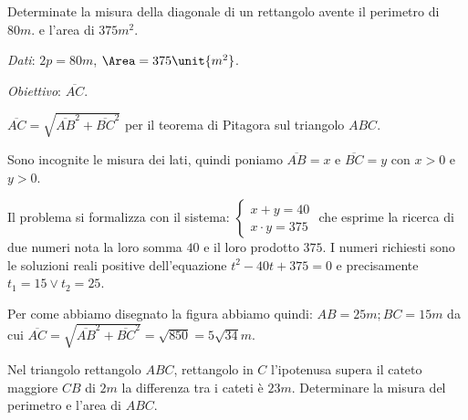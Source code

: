 \begin{problema}
Determinate la misura della diagonale di un rettangolo avente il perimetro di 
\(80\unit{m}\). e l'area di \(375\unit{m^2}\).
\end{problema}

{
\emph{Dati}: \(2 p = 80 \unit{m}\), \(\Area = 375\unit{m^2}\).

\emph{Obiettivo}: \(\overline {AC}\).
}
{\begin{center}
 
\end{center}}

\begin{soluzione}

\(\overline {AC} = \sqrt{\overline {AB}^{2} +\overline {BC}^{2}}\) per il 
teorema 
di Pitagora sul triangolo \(ABC\).

Sono incognite le misura dei lati, quindi poniamo \(\overline {AB} = x\) e 
\(\overline {BC} = y \) con \(x > 0\) e \(y > 0\).

Il problema si formalizza con il sistema:
\(\left\{ \begin{array}{l} x +y = 40 \\x \cdot y = 375 \end{array}\right.\)
che esprime la ricerca di due numeri nota la loro somma \(40\) e il loro 
prodotto 
\(375\). I numeri richiesti sono le soluzioni reali positive dell'equazione 
\(t^{2} 
-40 t +375 = 0\) e precisamente \(t_{1} = 15 \vee t_{2} = 25\).

Per come abbiamo disegnato la figura abbiamo quindi: \(AB = 25\unit{m}; BC = 
15\unit{m}\) da cui \(\overline {AC} = \sqrt{\overline {AB}^{2} +\overline 
{BC}^{2}} =\sqrt{850} = 5 \sqrt{34}\unit{m}\).
\end{soluzione}

\begin{problema}
Nel triangolo rettangolo \(ABC\), rettangolo in \(C\) l'ipotenusa supera il 
cateto maggiore \(CB\) di \(2\unit{m}\) la differenza tra i cateti è 
\(23\unit{m}\). 
Determinare la misura del perimetro e l'area di \(ABC\).
\end{problema}


